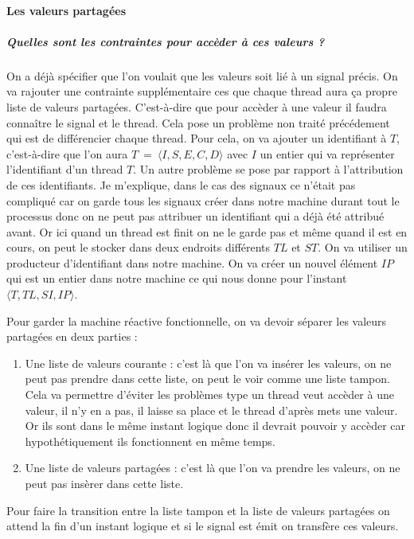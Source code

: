 \documentclass[10pt,a4paper]{article}
\begin{document}
				\paragraph{Les valeurs partagées}
				
					\subparagraph{Quelles sont les contraintes pour accèder à ces valeurs ?}
					On a déjà spécifier que l'on voulait que les valeurs soit lié à un signal précis. On va rajouter une contrainte supplémentaire ces que chaque thread aura ça propre liste de valeurs partagées. C'est-à-dire que pour accèder à une valeur il faudra connaître le signal et le thread. Cela pose un problème non traité précédement qui est de différencier chaque thread. Pour cela, on va ajouter un identifiant à $T$, c'est-à-dire que l'on aura $T~=~\langle I,S,E,C,D\rangle$ avec $I$ un entier qui va représenter l'identifiant d'un thread $T$. Un autre problème se pose par rapport à l'attribution de ces identifiants.
					\smallbreak
					Je m'explique, dans le cas des signaux ce n'était pas compliqué car on garde tous les signaux créer dans notre machine durant tout le processus donc on ne peut pas attribuer un identifiant qui a déjà été attribué avant. Or ici quand un thread est finit on ne le garde pas et même quand il est en cours, on peut le stocker dans deux endroits différents $TL$ et $ST$. On va utiliser un producteur d'identifiant dans notre machine. On va créer un nouvel élément $IP$ qui est un entier dans notre machine ce qui nous donne pour l'instant $\langle T,TL,SI,IP\rangle$.
					\medbreak
					
					Pour garder la machine réactive fonctionnelle, on va devoir séparer les valeurs partagées en deux parties :
					\begin{enumerate}
						\item Une liste de valeurs courante : c'est là que l'on va insérer les valeurs, on ne peut pas prendre dans cette liste, on peut le voir comme une liste tampon. Cela va permettre d'éviter les problèmes type un thread veut accèder à une valeur, il n'y en a pas, il laisse sa place et le thread d'après mets une valeur. Or ils sont dans le même instant logique donc il devrait pouvoir y accèder car hypothétiquement ils fonctionnent en même temps.
						\item Une liste de valeurs partagées : c'est là que l'on va prendre les valeurs, on ne peut pas insèrer dans cette liste.
					\end{enumerate}
					\smallbreak
					Pour faire la transition entre la liste tampon et la liste de valeurs partagées on attend la fin d'un instant logique et si le signal est émit on transfère ces valeurs.
					\medbreak
					
\end{document}
